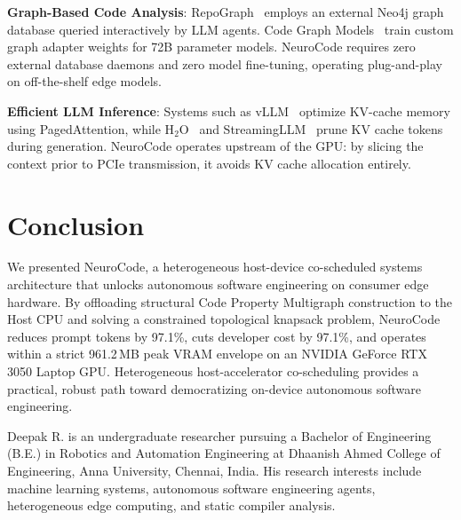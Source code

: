 \documentclass[journal]{IEEEtran}
\begin{document}
\textbf{Graph-Based Code Analysis}: RepoGraph~\cite{repograph2025} employs an external Neo4j graph database queried interactively by LLM agents. Code Graph Models~\cite{codegraph2025} train custom graph adapter weights for 72B parameter models. NeuroCode requires zero external database daemons and zero model fine-tuning, operating plug-and-play on off-the-shelf edge models.

\textbf{Efficient LLM Inference}: Systems such as vLLM~\cite{kwon2023vllm} optimize KV-cache memory using PagedAttention, while H$_2$O~\cite{zhang2023h2o} and StreamingLLM~\cite{xiao2024streamingllm} prune KV cache tokens during generation. NeuroCode operates upstream of the GPU: by slicing the context prior to PCIe transmission, it avoids KV cache allocation entirely.

\section{Conclusion}
\label{sec:conclusion}

We presented NeuroCode, a heterogeneous host-device co-scheduled systems architecture that unlocks autonomous software engineering on consumer edge hardware. By offloading structural Code Property Multigraph construction to the Host CPU and solving a constrained topological knapsack problem, NeuroCode reduces prompt tokens by 97.1\%, cuts developer cost by 97.1\%, and operates within a strict 961.2\,MB peak VRAM envelope on an NVIDIA GeForce RTX 3050 Laptop GPU. Heterogeneous host-accelerator co-scheduling provides a practical, robust path toward democratizing on-device autonomous software engineering.





\begin{IEEEbiographynophoto}{Deepak R.}
is an undergraduate researcher pursuing a Bachelor of Engineering (B.E.) in Robotics and Automation Engineering at Dhaanish Ahmed College of Engineering, Anna University, Chennai, India. His research interests include machine learning systems, autonomous software engineering agents, heterogeneous edge computing, and static compiler analysis.
\end{IEEEbiographynophoto}
\end{document}
